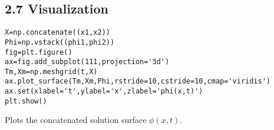 \documentclass[a4paper,11pt]{article}
\begin{document}
\subsection*{2.7 Visualization}
\begin{verbatim}
X=np.concatenate((x1,x2))
Phi=np.vstack((phi1,phi2))
fig=plt.figure()
ax=fig.add_subplot(111,projection='3d')
Tm,Xm=np.meshgrid(t,X)
ax.plot_surface(Tm,Xm,Phi,rstride=10,cstride=10,cmap='viridis')
ax.set(xlabel='t',ylabel='x',zlabel='phi(x,t)')
plt.show()
\end{verbatim}
Plots the concatenated solution surface \(\phi(x,t)\).
\end{document}
